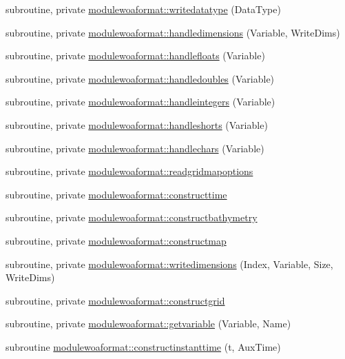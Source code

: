 \begin{DoxyCompactItemize}
\item 
subroutine, private \mbox{\hyperlink{namespacemodulewoaformat_a87baefa0ce052791b45523ab1bd52868}{modulewoaformat\+::writedatatype}} (Data\+Type)
\item 
subroutine, private \mbox{\hyperlink{namespacemodulewoaformat_a1755d2188a0690fff10f808cf9ecec9a}{modulewoaformat\+::handledimensions}} (Variable, Write\+Dims)
\item 
subroutine, private \mbox{\hyperlink{namespacemodulewoaformat_a6f71dbf9ea3807fb2646798269449c84}{modulewoaformat\+::handlefloats}} (Variable)
\item 
subroutine, private \mbox{\hyperlink{namespacemodulewoaformat_ad8813b60f60898f593061c4a41c50e3f}{modulewoaformat\+::handledoubles}} (Variable)
\item 
subroutine, private \mbox{\hyperlink{namespacemodulewoaformat_a4e5df04e6cd82c093f6173f3e08019aa}{modulewoaformat\+::handleintegers}} (Variable)
\item 
subroutine, private \mbox{\hyperlink{namespacemodulewoaformat_a42841ad86b89b6a226e5430c17a32293}{modulewoaformat\+::handleshorts}} (Variable)
\item 
subroutine, private \mbox{\hyperlink{namespacemodulewoaformat_a30b457447914696134f34e0ad5f8a6e0}{modulewoaformat\+::handlechars}} (Variable)
\item 
subroutine, private \mbox{\hyperlink{namespacemodulewoaformat_aa0e457259f521e3a55f034b74dd55c94}{modulewoaformat\+::readgridmapoptions}}
\item 
subroutine, private \mbox{\hyperlink{namespacemodulewoaformat_a99ab25469c7485e8abd999389b55602e}{modulewoaformat\+::constructtime}}
\item 
subroutine, private \mbox{\hyperlink{namespacemodulewoaformat_add300745a920cfd269052d32ca0ccfc7}{modulewoaformat\+::constructbathymetry}}
\item 
subroutine, private \mbox{\hyperlink{namespacemodulewoaformat_a5db9ab670b36026be5980f95935f64f6}{modulewoaformat\+::constructmap}}
\item 
subroutine, private \mbox{\hyperlink{namespacemodulewoaformat_a2416c77f949cd03e164c70c78493ad37}{modulewoaformat\+::writedimensions}} (Index, Variable, Size, Write\+Dims)
\item 
subroutine, private \mbox{\hyperlink{namespacemodulewoaformat_a2b1ae956746e53538872b16c62bcf308}{modulewoaformat\+::constructgrid}}
\item 
subroutine, private \mbox{\hyperlink{namespacemodulewoaformat_a0dce7fe9b034991dc5845a3e8ecc8cba}{modulewoaformat\+::getvariable}} (Variable, Name)
\item 
subroutine \mbox{\hyperlink{namespacemodulewoaformat_abe5b46fe3452046bddc33fbef20098f7}{modulewoaformat\+::constructinstanttime}} (t, Aux\+Time)
\end{DoxyCompactItemize}
